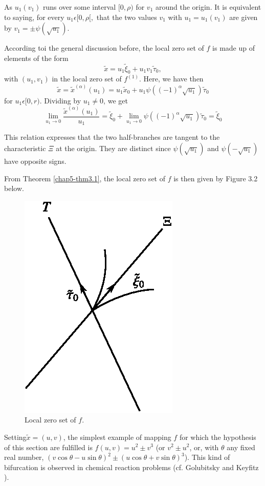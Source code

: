 As $u_{1}(v_{1})$ runs over some interval $[0, \rho)$ for $v_{1}$
  around the origin. It is equivalent to saying, for every $u_{1}
  \epsilon [0, \rho[,$ that the two values $v_{1}$ with $u_{1} =
      u_{1}(v_{1})$ are given by $v_{1} = \pm \psi (\sqrt{u_{1}})$.

According toi the general discussion before, the local zero set of $f$
is made up of elements of the form
$$
\widetilde{x} = u_{1}\widetilde{\xi}_{0} + u_{1}v_{1}\widetilde{\tau}_{0},
$$
with $(u_{1}, v_{1})$ in the local zero set of $f^{(1)}$. Here, we
have then 
$$ 
\widetilde{x} = \widetilde{x}^{(\alpha)}(u_{1}) =
u_{1}\widetilde{x}_{0} + u_{1}\psi((-1)^{\alpha}\sqrt{u_{1}})\widetilde{\tau}_{0}
$$
for $u_{1} \epsilon [0, r)$. Dividing by $u_{1} \neq 0$, we get
$$ 
\lim_{u_{1} \to 0} \frac{\widetilde{x}^{(\alpha)}(u_{1})}{u_{1}} =
\widetilde{\xi}_{0} + \lim_{u_{1} \to 0} \psi((-1)^{\alpha}
\sqrt{u_{1}}) \widetilde{\tau}_{0} = \widetilde{\xi}_{0}
$$

This relation expresses that the two half-branches are tangent to the
characteristic $\Xi$ at the origin. They are distinct since
$\psi(\sqrt{u_{1}})$ and $\psi(-\sqrt{u_{1}})$ have opposite signs.

From Theorem \ref{chap5-thm3.1}, the local zero set of $f$ is then given
by Figure 3.2 below.
\begin{figure}[H]
\centering
\includegraphics{figure/fig76-3.2_2.eps}
\caption{Local zero set of $f$.}
\end{figure}


Setting\pageoriginale $\widetilde{x} = (u, v)$, the simplest example
of mapping $f$ for which the hypothesis of this section are fulfilled is
$f(u, v) = u^{2} \pm v^{3}$ (or $v^{2} \pm u^{2}$, or, with $\theta$
any fixed real number, $(v \cos \theta - u \sin \theta)^{2} \pm (u
\cos \theta + v \sin \theta)^{3}$). This kind of bifurcation is
observed in chemical reaction problems (cf. Golubitsky and Keyfitz \cite{13}).


